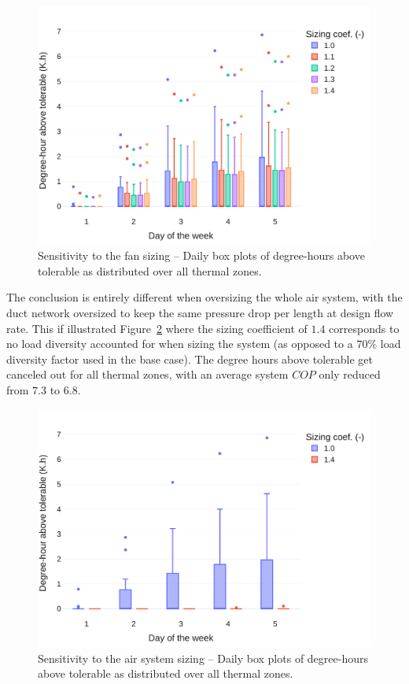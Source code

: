 \begin{figure}[!htbp]
    \centering
    \includegraphics[width=.7\linewidth]{../python_scripts/figures/FanSizing.pdf}
    \caption{Sensitivity to the fan sizing -- Daily box plots of degree-hours above tolerable as distributed over all thermal zones.}
    \label{fig:fan}
\end{figure}

The conclusion is entirely different when oversizing the whole air system, with the duct network oversized to keep the same pressure drop per length at design flow rate. This if illustrated Figure~\ref{fig:system} where the sizing coefficient of $1.4$ corresponds to no load diversity accounted for when sizing the system (as opposed to a $70\%$ load diversity factor used in the base case). The degree hours above tolerable get canceled out for all thermal zones, with an average system $COP$ only reduced from $7.3$ to $6.8$.

\begin{figure}[!htbp]
    \centering
    \includegraphics[width=.7\linewidth]{../python_scripts/figures/SystemSizing.pdf}
    \caption{Sensitivity to the air system sizing -- Daily box plots of degree-hours above tolerable as distributed over all thermal zones.}
    \label{fig:system}
\end{figure}





